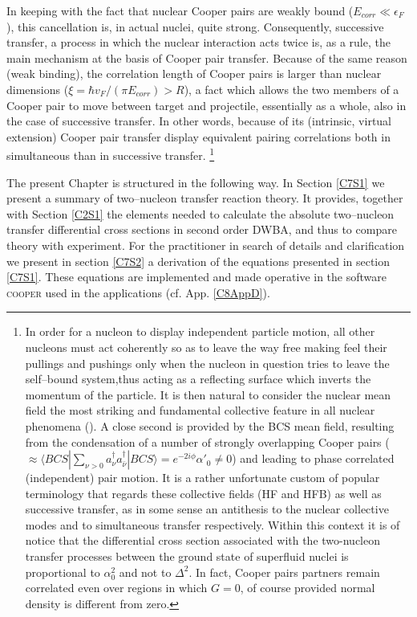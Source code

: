 In keeping with the fact that nuclear Cooper pairs are weakly bound ($E_{corr}\ll \epsilon_F$), this cancellation is, in actual nuclei, quite strong. Consequently, successive transfer, a process in which the nuclear interaction acts twice is, as a rule, the main mechanism at the basis of Cooper pair transfer. Because of the same reason (weak binding), the correlation length of Cooper pairs is larger than nuclear dimensions ($\xi=\hbar v_F/(\pi E_{corr})> R$), a fact which allows the two members of a Cooper pair to move between target and projectile, essentially as a whole, also in the case of successive transfer. In other words, because of its (intrinsic, virtual extension) Cooper pair transfer display equivalent 	pairing correlations both in simultaneous than in successive transfer. \footnote{In order for a nucleon to display independent particle motion, all other nucleons must act coherently so as to leave the way free making feel their pullings and pushings only when the nucleon in question tries to leave the self--bound system,thus acting as a reflecting surface which inverts the momentum of the particle. It is then natural to consider the nuclear mean field the most striking and fundamental collective feature in all nuclear phenomena (\cite{Mottelson:62}). A close second is provided by the BCS mean field, resulting from the condensation of a number of strongly overlapping Cooper pairs ($ \approx \langle BCS|\sum_{\nu>0}a^\dagger_\nu a^\dagger_{\bar\nu}|BCS\rangle=e^{-2i\phi}\alpha'_0\neq 0$) and leading to phase correlated (independent) pair motion. It is a rather unfortunate custom of popular terminology that regards these collective fields (HF and HFB) as well as successive transfer, as in some sense an antithesis to the nuclear collective modes  and to simultaneous transfer respectively. Within this context it is of notice that the  differential cross section associated with the two-nucleon transfer  processes	between the ground state of superfluid nuclei is proportional to $\alpha_0^2$ and not to $\Delta^2$. In fact, Cooper pairs partners remain correlated even over regions in which $G=0$, of course provided normal density is different from zero.}


 



The present Chapter is structured in the following way. In Section \ref{C7S1} we present a summary of two--nucleon transfer reaction theory. It provides, together with Section \ref{C2S1} the elements needed to calculate the absolute two--nucleon transfer differential cross sections in second order DWBA, and thus to compare theory with experiment.
For the practitioner in search of details and clarification we present in section \ref{C7S2}  a  derivation of the equations presented in section \ref{C7S1}. These equations are implemented and made operative  in the software \textsc{cooper}  used in the applications (cf. App. \ref{C8AppD}).


